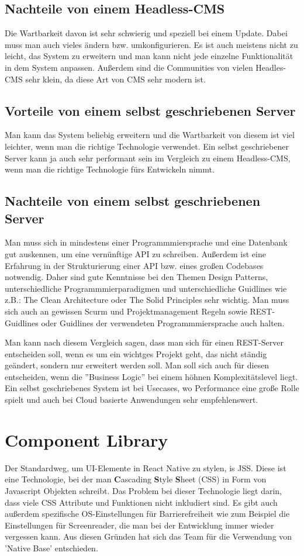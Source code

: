 \subsection{Nachteile von einem Headless-CMS}

Die Wartbarkeit davon ist sehr schwierig und speziell bei einem Update. Dabei muss man auch vieles ändern bzw. umkonfigurieren.
Es ist auch meistens nicht zu leicht, das System zu erweitern und man kann nicht jede einzelne Funktionalität in dem System anpassen.
Außerdem sind die Communities von vielen Headles-CMS sehr klein, da diese Art von CMS sehr modern ist.
\subsection{Vorteile von einem selbst geschriebenen Server}
Man kann das System beliebig erweitern und die Wartbarkeit von diesem ist viel leichter, wenn man die richtige Technologie verwendet. Ein selbst geschriebener Server kann ja auch sehr performant sein im Vergleich zu einem Headless-CMS, wenn man die richtige Technologie fürs Entwickeln nimmt.

\subsection{Nachteile von einem selbst geschriebenen Server}
Man muss sich in mindestens einer Programmmiersprache und eine Datenbank gut auskennen,
um eine vernünftige API zu schreiben.
Außerdem ist eine Erfahrung in der Strukturierung einer API bzw. eines großen Codebases notwendig.
Daher sind gute Kenntnisse bei den Themen Design Patterns, unterschiedliche Programmmierparadigmen und unterschiedliche Guidlines wie z.B.: The Clean Architecture oder The Solid Principles sehr wichtig. Man muss sich auch an gewissen Scurm und Projektmanagement Regeln sowie REST-Guidlines oder Guidlines der verwendeten Programmmiersprache auch halten.


Man kann nach diesem Vergleich sagen, dass man sich für einen REST-Server entscheiden soll, wenn es um ein wichtges Projekt geht, das nicht ständig geändert, sondern nur erweitert werden soll.
Man soll sich auch für diesen entscheiden, wenn die ''Business Logic'' bei einem höhnen Komplexitätslevel liegt. Ein selbst geschriebenes System ist bei Usecases, wo Performance eine große Rolle spielt und auch bei Cloud basierte Anwendungen sehr empfehlenswert.

\section{Component Library}
Der Standardweg, um UI-Elemente in React Native zu stylen, is JSS. Diese ist eine Technologie, bei der man \textbf{C}ascading \textbf{S}tyle \textbf{S}heet (CSS)
in Form von Javascript Objekten schreibt. Das Problem bei dieser Technologie liegt darin,
dass viele CSS Attribute und Funktionen nicht inkludiert sind. Es gibt auch außerdem spezifische OS-Einstellungen für Barrierefreiheit wie zum Beispiel die Einstellungen für Screenreader,
die man bei der Entwicklung immer wieder vergessen kann.
Aus diesen Gründen hat sich das Team für die Verwendung von 'Native Base' entschieden.


